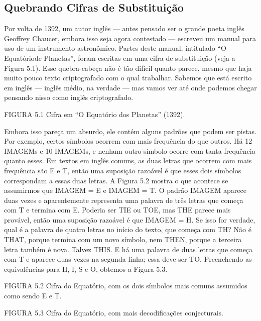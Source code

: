 \documentclass{book}
\begin{document}

\subsection{Quebrando Cifras de Substituição}
\label{segredos:cifras}

Por volta de 1392, um autor inglês --- antes pensado ser o grande poeta inglês Geoffrey Chaucer, embora isso seja agora contestado --- escreveu um manual para uso de um instrumento astronômico. Partes deste manual, intitulado ``O Equatóriode Planetas'', foram escritas em uma cifra de substituição (veja a Figura 5.1). Esse quebra-cabeça não é tão difícil quanto parece, mesmo que haja muito pouco texto criptografado com o qual trabalhar. Sabemos que está escrito em inglês --- inglês médio, na verdade --- mas vamos ver até onde podemos chegar pensando nisso como inglês criptografado.

FIGURA 5.1 Cifra em ``O Equatório dos Planetas'' (1392).

Embora isso pareça um absurdo, ele contém alguns padrões que podem ser pistas. Por exemplo, certos símbolos ocorrem com mais frequência do que outros. Há 12 IMAGEMs e 10 IMAGEMs, e nenhum outro símbolo ocorre com tanta frequência quanto esses. Em textos em inglês comuns, as duas letras que ocorrem com mais frequência são E e T, então uma suposição razoável é que esses dois símbolos correspondam a essas duas letras. A Figura 5.2 mostra o que acontece se assumirmos que IMAGEM = E e IMAGEM = T. O padrão IMAGEM aparece duas vezes e aparentemente representa uma palavra de três letras que começa com T e termina com E. Poderia ser TIE ou TOE, mas THE parece mais provável, então uma suposição razoável é que IMAGEM = H. Se isso for verdade, qual é a palavra de quatro letras no início do texto, que começa com TH? Não é THAT, porque termina com um novo símbolo, nem THEN, porque a terceira letra também é nova. Talvez THIS. E há uma palavra de duas letras que começa com T e aparece duas vezes na segunda linha; essa deve ser TO. Preenchendo as equivalências para H, I, S e O, obtemos a Figura 5.3.

FIGURA 5.2 Cifra do Equatório, com os dois símbolos mais comuns assumidos como sendo E e T.

FIGURA 5.3 Cifra do Equatório, com mais decodificações conjecturais.
\end{document}
